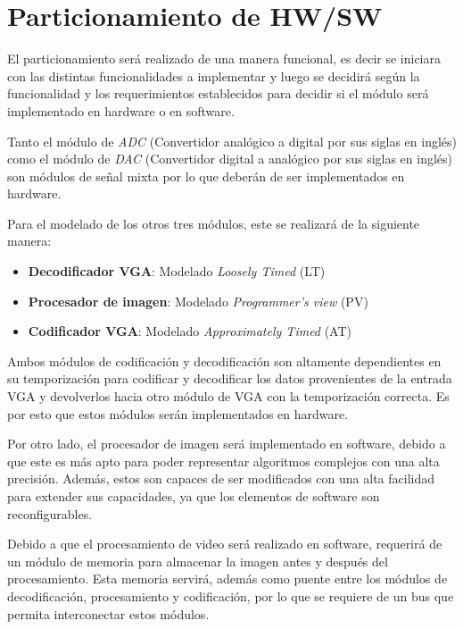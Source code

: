 \documentclass[10pt, letterpaper, conference]{IEEEtran}
\begin{document}
\section{Particionamiento de HW/SW}
\label{sec:partitioning}

El particionamiento ser\'a realizado de una manera funcional, es decir
se iniciara con las distintas funcionalidades a implementar y luego se
decidir\'a seg\'un la funcionalidad y los
requerimientos establecidos para decidir si el m\'odulo ser\'a
implementado en hardware o en software.

Tanto el m\'odulo de \emph{ADC} (Convertidor anal\'ogico a digital por
sus siglas en ingl\'es) como el m\'odulo de \emph{DAC} (Convertidor
digital a anal\'ogico por sus siglas en ingl\'es) son m\'odulos de
señal mixta por lo que deber\'an de ser implementados en hardware.

Para el modelado de los otros tres m\'odulos, este se realizar\'a de
la siguiente manera:

\begin{itemize}
    \item \textbf{Decodificador VGA}: Modelado \emph{Loosely Timed} (LT)
    \item \textbf{Procesador de imagen}: Modelado \emph{Programmer's view} (PV)
    \item \textbf{Codificador VGA}: Modelado \emph{Approximately Timed} (AT)
\end{itemize}

Ambos m\'odulos de codificaci\'on y decodificaci\'on son altamente 
dependientes en su temporizaci\'on para codificar y decodificar los datos
provenientes de la entrada VGA y devolverlos hacia otro m\'odulo de VGA con 
la temporizaci\'on correcta. Es por esto que estos m\'odulos ser\'an
implementados en hardware.

Por otro lado, el procesador de imagen ser\'a implementado en software,
debido a que este es m\'as apto para poder representar algoritmos
complejos con una alta precisi\'on. Adem\'as, estos son capaces de ser
modificados con una alta facilidad para extender sus capacidades, 
ya que los elementos de software son reconfigurables.

Debido a que el procesamiento de video ser\'a realizado en software, 
requerir\'a de un m\'odulo de memoria para almacenar la imagen antes 
y despu\'es del procesamiento. Esta memoria servir\'a, adem\'as como puente
entre los m\'odulos de decodificaci\'on, procesamiento y codificaci\'on, por
lo que se requiere de un bus que permita interconectar estos m\'odulos.
\end{document}
